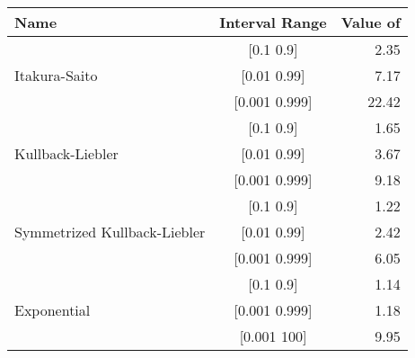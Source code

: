 \documentclass[11pt]{myclass}
\begin{document}
\begin{center}
  \begin{tabular}{| l | c | r |}
    \hline
    Name & Interval Range & Value of  \\ \hline
     & [0.1 0.9] & 2.35 \\ 
     Itakura-Saito & [0.01 0.99] & 7.17 \\ 
     & [0.001 0.999] & 22.42 \\   
     \hline
     & [0.1 0.9] & 1.65 \\ 
     Kullback-Liebler & [0.01 0.99] & 3.67 \\ 
     & [0.001 0.999] & 9.18 \\   
     \hline
     & [0.1 0.9] & 1.22 \\ 
     Symmetrized Kullback-Liebler & [0.01 0.99] & 2.42 \\ 
     & [0.001 0.999] & 6.05 \\   
     \hline
     & [0.1 0.9] & 1.14 \\ 
     Exponential  & [0.001 0.999] & 1.18 \\ 
     & [0.001 100] & 9.95 \\   
     \hline
  \end{tabular}
\end{center}
\newpage


\end{document}

